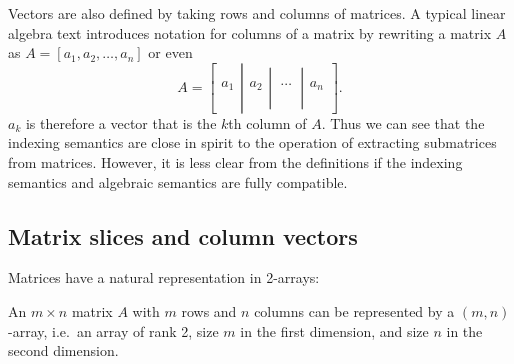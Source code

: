 Vectors are also defined
by taking rows and columns of matrices. A typical linear algebra text
introduces notation for columns of a matrix by rewriting a matrix $A$ as
$A = [a_1, a_2, \dots, a_n]$ or even~\cite[for example,
p. 6]{Trefethen1997}
\[
A = \left[\left.\begin{array}{c}
\\
\\
a_1\\
\\
\\
\end{array}\right|\begin{array}{c}
\\
\\
a_2\\
\\
\\
\end{array}\left|\begin{array}{c}
\\
\\
\ \cdots\ \\
\\
\\
\end{array}\right|\begin{array}{c}
\\
\\
a_n\\
\\
\\
\end{array}\right].\label{eq:cols}
\]
%
$a_k$ is therefore a vector that is the $k$th column of $A$.  Thus we can see that
the indexing semantics are close in spirit to the operation of extracting
submatrices from matrices. However, it is less clear from the definitions if
the indexing semantics and algebraic semantics are fully compatible.



\subsection{Matrix slices and column vectors}

Matrices have a natural representation in 2-arrays:

An $m \times n$ matrix $A$ with $m$ rows and $n$ columns can be
	represented by a $(m,n)$-array, i.e.\ an array of rank 2, size $m$ in
	the first dimension, and size $n$ in the second
	dimension.\label{rule:mat}


